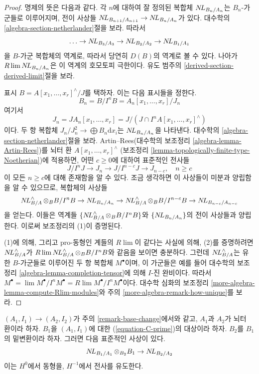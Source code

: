 \begin{proof}
명제의 뜻은 다음과 같다. 각 $n$에 대하여 잘 정의된 복합체
$\mathop{N\!L}\nolimits_{B_n/A_n}$는 $B_n$-가군들로 이루어지며, 전이 사상들
$\mathop{N\!L}\nolimits_{B_{n + 1}/A_{n + 1}} \to \mathop{N\!L}\nolimits_{B_n/A_n}$가 있다.
대수학의 \ref{algebra-section-netherlander}절을 보라.
따라서
$$
\ldots \to \mathop{N\!L}\nolimits_{B_3/A_3} \to \mathop{N\!L}\nolimits_{B_2/A_2} \to \mathop{N\!L}\nolimits_{B_1/A_1}
$$
을 $B$-가군 복합체의 역계로, 따라서 당연히 $D(B)$의 역계로 볼 수 있다.
나아가 $R\mathop{\mathrm{lim}}\nolimits \mathop{N\!L}\nolimits_{B_n/A_n}$은 이 역계의 호모토피 극한이다.
유도 범주의 \ref{derived-section-derived-limit}절을 보라.

\medskip\noindent
표시 $B = A[x_1, \ldots, x_r]^\wedge / J$를 택하자. 이는 다음 표시들을 정한다.
$$
B_n = B/I^nB = A_n[x_1, \ldots, x_r]/J_n
$$
여기서
$$
J_n = JA_n[x_1, \ldots, x_r] =
J/(J \cap I^nA[x_1, \ldots, x_r]^\wedge)
$$
이다. 두 항 복합체 $J_n/J_n^2 \longrightarrow \bigoplus B_n \text{d}x_i$는
$\mathop{N\!L}\nolimits_{B_n/A_n}$을 나타낸다. 대수학의 \ref{algebra-section-netherlander}절을 보라.
Artin--Rees(대수학의 보조정리 \ref{algebra-lemma-Artin-Rees})를
뇌터 환 $A[x_1, \ldots, x_r]^\wedge$
(보조정리 \ref{lemma-topologically-finite-type-Noetherian})에 적용하면,
어떤 $c \geq 0$에 대하여 표준적인 전사들
$$
J/I^nJ \to J_n \to J/I^{n - c}J \to J_{n - c},\quad n \geq c
$$
이 모든 $n \geq c$에 대해 존재함을 알 수 있다.
조금 생각하면 이 사상들이 미분과 양립함을 알 수 있으므로, 복합체의 사상들
$$
\mathop{N\!L}\nolimits_{B/A}^\wedge \otimes_B B/I^nB \to
\mathop{N\!L}\nolimits_{B_n/A_n} \to
\mathop{N\!L}\nolimits_{B/A}^\wedge \otimes_B B/I^{n - c}B \to
\mathop{N\!L}\nolimits_{B_{n - c}/A_{n - c}}
$$
을 얻는다. 이들은 역계들 $\{\mathop{N\!L}\nolimits_{B/A}^\wedge \otimes_B B/I^nB\}$와
$\{\mathop{N\!L}\nolimits_{B_n/A_n}\}$의 전이 사상들과 양립한다. 이로써 보조정리의 (1)이 증명된다.

\medskip\noindent
(1)에 의해, 그리고 pro-동형인 계들의 $R\lim$이 같다는 사실에 의해,
(2)를 증명하려면 $\mathop{N\!L}\nolimits_{B/A}^\wedge$가
$R\mathop{\mathrm{lim}}\nolimits \mathop{N\!L}\nolimits_{B/A}^\wedge \otimes_B B/I^nB$와 같음을 보이면 충분하다.
그런데 $\mathop{N\!L}\nolimits_{B/A}^\wedge$는 유한 $B$-가군들로 이루어진 두 항 복합체
$M^\bullet$이며, 이 가군들은 예를 들어 대수학의 보조정리
\ref{algebra-lemma-completion-tensor}에 의해 $I$-진 완비이다. 따라서
$M^\bullet = \lim M^\bullet/I^nM^\bullet = R\lim M^\bullet/I^n M^\bullet$이다.
대수학 심화의 보조정리 \ref{more-algebra-lemma-compute-Rlim-modules}와
주의 \ref{more-algebra-remark-how-unique}를 보라.
\end{proof}

\begin{lemma}
\label{lemma-NL-base-change}
$(A_1, I_1) \to (A_2, I_2)$가 주의 \ref{remark-base-change}에서와 같고,
$A_1$과 $A_2$가 뇌터 환이라 하자.
$B_1$을 $(A_1, I_1)$에 대한 (\ref{equation-C-prime})의 대상이라 하자.
$B_2$를 $B_1$의 밑변환이라 하자. 그러면 다음 표준적인 사상이 있다.
$$
\mathop{N\!L}\nolimits_{B_1/A_1} \otimes_{B_2} B_1 \to \mathop{N\!L}\nolimits_{B_2/A_2}
$$
이는 $H^0$에서 동형을, $H^{-1}$에서 전사를 유도한다.
\end{lemma}

